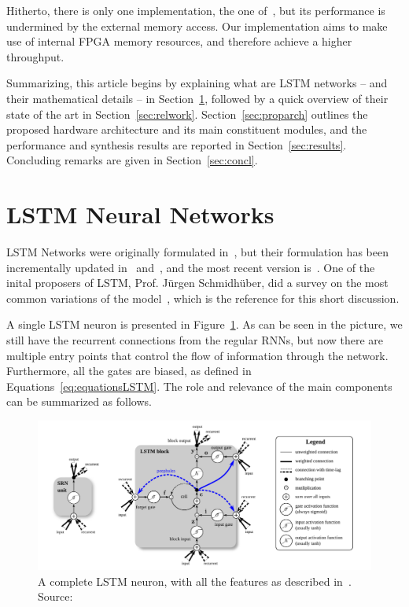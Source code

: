 \documentclass{IEEEtran}
\begin{document}
Hitherto, there is only one implementation, the one of~\cite{Chang15}, but its performance is undermined
by the external memory access. Our implementation aims to make use of internal FPGA memory resources,
and therefore achieve a higher throughput.

Summarizing, this article begins by explaining what are LSTM networks -- and their mathematical
details -- in Section~\ref{sec:lstmnn}, followed by a quick overview of their state
of the art in Section~\ref{sec:relwork}. Section~\ref{sec:proparch} outlines the proposed
hardware architecture and its main constituent modules, and the performance and synthesis
results are reported in Section~\ref{sec:results}. Concluding remarks are given in
Section~\ref{sec:concl}.

\section{LSTM Neural Networks}\label{sec:lstmnn}
LSTM Networks were originally formulated in~\cite{Hoch97}, but their formulation has been incrementally
updated in~\cite{Gers00} and~\cite{Gers2000}, and the most recent version is~\cite{Graves05}.
One of the inital proposers of LSTM, Prof. Jürgen Schmidhüber, did a survey on the most common variations
of the model~\cite{Greff15}, which is the reference for this short discussion.

A single LSTM neuron is presented in Figure~\ref{fig:lstmneuron}. As can be seen in the picture,
we still have the recurrent connections from the regular RNNs, but now there are multiple entry points
that control the flow of information through the network. Furthermore, all the
gates are biased, as defined in Equations~\ref{eq:equationsLSTM}. The role and relevance of the main components can
be summarized as follows.

\begin{figure}[!t]
	\centering
	\includegraphics[width=1.1\linewidth]{figures/lstmneuron.png}
    \caption{A complete LSTM neuron, with all the features as described in~\cite{Graves05}. Source:~\cite{Greff15}}
	\label{fig:lstmneuron}
\end{figure}
\end{document}
